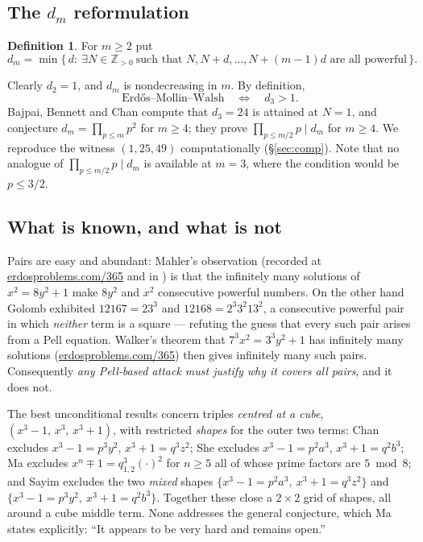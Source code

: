 \documentclass[11pt]{article}
\theoremstyle{definition}
\newtheorem{definition}[theorem]{Definition}
\begin{document}
\subsection{The $d_m$ reformulation}

\begin{definition}\label{def:dm}
For $m\ge 2$ put
\[ d_m=\min\{\,d:\ \exists N\in\mathbb Z_{>0}\ \text{such that } N,N+d,\dots,N+(m-1)d \text{ are all powerful}\,\}.\]
\end{definition}

Clearly $d_2=1$, and $d_m$ is nondecreasing in $m$. By definition,
\[
\text{Erdős--Mollin--Walsh}\quad\Longleftrightarrow\quad d_3>1.
\]
Bajpai, Bennett and Chan \cite{bajpai2024} compute that $d_3=24$ is attained at
$N=1$, and conjecture $d_m=\prod_{p\le m}p^2$ for $m\ge4$; they prove
$\prod_{p\le m/2}p\mid d_m$ for $m\ge4$. We reproduce the witness $(1,25,49)$
computationally (\S\ref{sec:comp}). Note that no analogue of
$\prod_{p\le m/2}p\mid d_m$ is available at $m=3$, where the condition would be
$p\le 3/2$.

\subsection{What is known, and what is not}

Pairs are easy and abundant: Mahler's observation (recorded at
\url{erdosproblems.com/365} and in \cite{bajpai2024}) is that the infinitely many
solutions of $x^2=8y^2+1$ make $8y^2$ and $x^2$ consecutive powerful numbers. On
the other hand Golomb \cite{golomb1970} exhibited $12167=23^3$ and
$12168=2^3 3^2 13^2$, a consecutive powerful pair in which \emph{neither} term is a
square --- refuting the guess that every such pair arises from a Pell equation.
Walker's theorem that $7^3x^2=3^3y^2+1$ has infinitely many solutions
(\url{erdosproblems.com/365}) then gives infinitely many such pairs. Consequently
\emph{any Pell-based attack must justify why it covers all pairs}, and it does not.

The best unconditional results concern triples \emph{centred at a cube},
$(x^3-1,\,x^3,\,x^3+1)$, with restricted \emph{shapes} for the outer two terms:
Chan \cite{chan2025} excludes $x^3-1=p^3y^2$, $x^3+1=q^3z^2$; She \cite{she2025}
excludes $x^3-1=p^2a^3$, $x^3+1=q^2b^3$; Ma \cite{ma2026} excludes
$x^n\mp1=q_{1,2}^3(\cdot)^2$ for $n\ge5$ all of whose prime factors are $5\bmod 8$;
and Sayim \cite{sayim2026} excludes the two \emph{mixed} shapes
$\{x^3-1=p^2a^3,\ x^3+1=q^3z^2\}$ and $\{x^3-1=p^3y^2,\ x^3+1=q^2b^3\}$.
Together these close a $2\times2$ grid of shapes, all around a cube middle term.
None addresses the general conjecture, which Ma states explicitly: ``It appears to be
very hard and remains open.''
\end{document}
